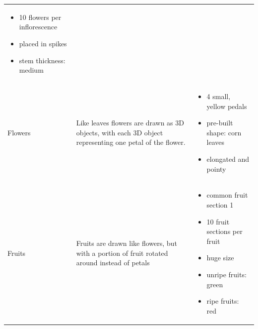 \begin{longtable}[c]{@{}p{}p{}p{}@{}}
	\begin{itemize}
		\item 10 flowers per inflorescence\vspace{-10pt}
		\item placed in spikes\vspace{-10pt}
		\item stem thickness:  medium\vspace{-10pt}
	\end{itemize} \\
	Flowers                 & Like leaves flowers are drawn as 3D objects, with each 3D object representing one petal of the flower.                                                                                                                      & \vspace{-25pt}
	\begin{itemize}
		\item 4 small, yellow pedals\vspace{-10pt}
		\item pre-built shape: corn leaves\vspace{-10pt}
		\item elongated and pointy\vspace{-10pt}
	\end{itemize} \\
	Fruits   & Fruits are drawn like flowers, but with a portion of fruit rotated around instead of petals                                                                                                                                 & \vspace{-25pt}
	\begin{itemize}
		\item common fruit section 1\vspace{-10pt}
		\item 10 fruit sections per fruit\vspace{-10pt}
		\item huge size\vspace{-10pt}
		\item unripe fruits: green\vspace{-10pt}
		\item ripe fruits: red\vspace{-10pt}
	\end{itemize}
\\* \bottomrule
\end{longtable}


